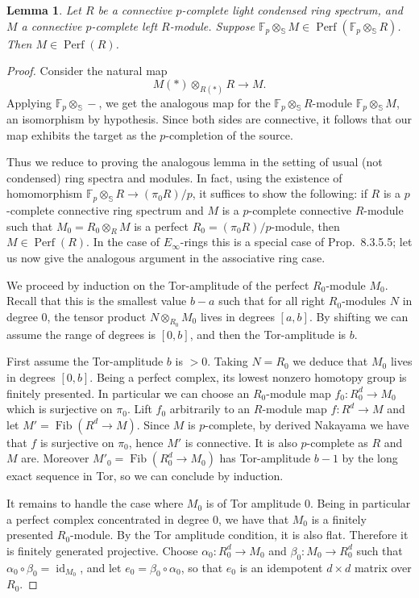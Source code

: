 \documentclass[12pt]{article}
\newtheorem{lemma}[theorem]{Lemma}
\newcommand{\on}{\operatorname}
\begin{document}
\begin{lemma}\label{checkperfmodp}
Let $R$ be a connective $p$-complete light condensed ring spectrum, and $M$ a connective $p$-complete left $R$-module.  Suppose $\mathbb{F}_p \otimes_\mathbb{S} M \in \on{Perf}(\mathbb{F}_p\otimes_\mathbb{S}R)$.  Then $M\in \on{Perf}(R)$.
\end{lemma}
\begin{proof}
Consider the natural map
$$M(\ast)\otimes_{R(\ast)} R\rightarrow M.$$
Applying $\mathbb{F}_p\otimes_\mathbb{S}-$, we get the analogous map for the $\mathbb{F}_p\otimes_{\mathbb{S}}R$-module $\mathbb{F}_p\otimes_{\mathbb{S}}M$, an isomorphism by hypothesis.  Since both sides are connective, it follows that our map exhibits the target as the $p$-completion of the source.

Thus we reduce to proving the analogous lemma in the setting of usual (not condensed) ring spectra and modules.  In fact, using the existence of homomorphism $\mathbb{F}_p\otimes_\mathbb{S}R \to (\pi_0R)/p$, it suffices to show the following: if $R$ is a $p$-complete connective ring spectrum and $M$ is a $p$-complete connective $R$-module such that $M_0 = R_0\otimes_{R}M$ is a perfect $R_0=(\pi_0R)/p$-module, then $M\in\on{Perf}(R)$.  In the case of $E_\infty$-rings this is a special case of \cite{LurieHA} Prop.\ 8.3.5.5; let us now give the analogous argument in the associative ring case.

We proceed by induction on the Tor-amplitude of the perfect $R_0$-module $M_0$.  Recall that this is the smallest value $b-a$ such that for all right $R_0$-modules $N$ in degree $0$, the tensor product $N\otimes_{R_0} M_0$ lives in degrees $[a,b]$.  By shifting we can assume the range of degrees is $[0,b]$, and then the Tor-amplitude is $b$.

First assume the Tor-amplitude $b$ is $>0$.  Taking $N=R_0$ we deduce that $M_0$ lives in degrees $[0,b]$.  Being a perfect complex, its lowest nonzero homotopy group is finitely presented.  In particular we can choose an $R_0$-module map $f_0:R_0^d \to M_0$ which is surjective on $\pi_0$.  Lift $f_0$ arbitrarily to an $R$-module map $f:R^d \to M$ and let $M'=\on{Fib}(R^d\to M)$.  Since $M$ is $p$-complete, by derived Nakayama we have that $f$ is surjective on $\pi_0$, hence $M'$ is connective.  It is also $p$-complete as $R$ and $M$ are.  Moreover $M'_0 = \on{Fib}(R_0^d\to M_0)$ has Tor-amplitude $b-1$ by the long exact sequence in Tor, so we can conclude by induction.

It remains to handle the case where $M_0$ is of Tor amplitude $0$.  Being in particular a perfect complex concentrated in degree $0$, we have that $M_0$ is a finitely presented $R_0$-module.  By the Tor amplitude condition, it is also flat.  Therefore it is finitely generated projective.  Choose $\alpha_0:R_0^d\to M_0$ and $\beta_0:M_0\to R_0^d$ such that $\alpha_0\circ \beta_0 = \on{id}_{M_0}$, and let $e_0=\beta_0 \circ \alpha_0$, so that $e_0$ is an idempotent $d\times d$ matrix over $R_0$.


\end{proof}
\end{document}
